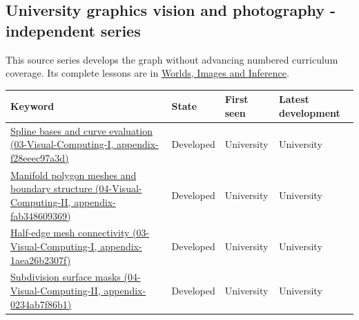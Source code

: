 \subsection{University graphics vision and photography - independent series}\label{appendix-a6d556a4ef50-university-graphics-vision-and-photography---independent-series}

This source series develops the graph without advancing numbered curriculum coverage. Its complete lessons are in \href{Continuous\%20Notes/University\%20-\%20Worlds,\%20Images\%20and\%20Inference\%20-\%20Graphics,\%20Vision\%20and\%20Photography}{Worlds, Images and Inference}.

{\def\LTcaptype{none} %
\begin{longtable}[]{@{}
  >{\raggedright\arraybackslash}p{}
  >{\raggedright\arraybackslash}p{}
  >{\raggedright\arraybackslash}p{}
  >{\raggedright\arraybackslash}p{}@{}}
\toprule\noalign{}
\begin{minipage}[b]{\linewidth}\raggedright
Keyword
\end{minipage} & \begin{minipage}[b]{\linewidth}\raggedright
State
\end{minipage} & \begin{minipage}[b]{\linewidth}\raggedright
First seen
\end{minipage} & \begin{minipage}[b]{\linewidth}\raggedright
Latest development
\end{minipage} \\
\midrule\noalign{}
\endhead
\bottomrule\noalign{}
\endlastfoot
\href{../03-Visual-Computing-I/main.pdf\#nameddest=appendix-f28eeec97a3d}{Spline bases and curve evaluation (03-Visual-Computing-I, appendix-f28eeec97a3d)} & Developed & University & University \\
\href{../04-Visual-Computing-II/main.pdf\#nameddest=appendix-fab348609369}{Manifold polygon meshes and boundary structure (04-Visual-Computing-II, appendix-fab348609369)} & Developed & University & University \\
\href{../03-Visual-Computing-I/main.pdf\#nameddest=appendix-1aea26b2307f}{Half-edge mesh connectivity (03-Visual-Computing-I, appendix-1aea26b2307f)} & Developed & University & University \\
\href{../04-Visual-Computing-II/main.pdf\#nameddest=appendix-0234ab7f86b1}{Subdivision surface masks (04-Visual-Computing-II, appendix-0234ab7f86b1)} & Developed & University & University \\

\end{longtable}}
